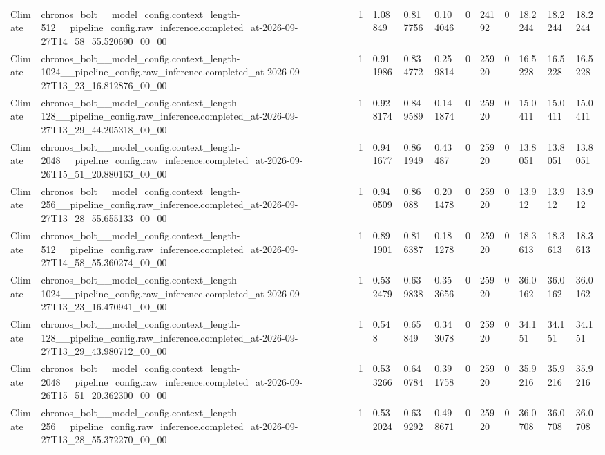 \begin{tabular}{llllllllllll}
Climate & chronos\_bolt\_\_model\_config.context\_length-512\_\_pipeline\_config.raw\_inference.completed\_at-2026-09-27T14\_58\_55.520690\_00\_00 & 1 & 1.08849 & 0.817756 & 0.104046 & 0 & 24192 & 0 & 18.2244 & 18.2244 & 18.2244 \\
Climate & chronos\_bolt\_\_model\_config.context\_length-1024\_\_pipeline\_config.raw\_inference.completed\_at-2026-09-27T13\_23\_16.812876\_00\_00 & 1 & 0.911986 & 0.834772 & 0.259814 & 0 & 25920 & 0 & 16.5228 & 16.5228 & 16.5228 \\
Climate & chronos\_bolt\_\_model\_config.context\_length-128\_\_pipeline\_config.raw\_inference.completed\_at-2026-09-27T13\_29\_44.205318\_00\_00 & 1 & 0.928174 & 0.849589 & 0.141874 & 0 & 25920 & 0 & 15.0411 & 15.0411 & 15.0411 \\
Climate & chronos\_bolt\_\_model\_config.context\_length-2048\_\_pipeline\_config.raw\_inference.completed\_at-2026-09-26T15\_51\_20.880163\_00\_00 & 1 & 0.941677 & 0.861949 & 0.43487 & 0 & 25920 & 0 & 13.8051 & 13.8051 & 13.8051 \\
Climate & chronos\_bolt\_\_model\_config.context\_length-256\_\_pipeline\_config.raw\_inference.completed\_at-2026-09-27T13\_28\_55.655133\_00\_00 & 1 & 0.940509 & 0.86088 & 0.201478 & 0 & 25920 & 0 & 13.912 & 13.912 & 13.912 \\
Climate & chronos\_bolt\_\_model\_config.context\_length-512\_\_pipeline\_config.raw\_inference.completed\_at-2026-09-27T14\_58\_55.360274\_00\_00 & 1 & 0.891901 & 0.816387 & 0.181278 & 0 & 25920 & 0 & 18.3613 & 18.3613 & 18.3613 \\
Climate & chronos\_bolt\_\_model\_config.context\_length-1024\_\_pipeline\_config.raw\_inference.completed\_at-2026-09-27T13\_23\_16.470941\_00\_00 & 1 & 0.532479 & 0.639838 & 0.353656 & 0 & 25920 & 0 & 36.0162 & 36.0162 & 36.0162 \\
Climate & chronos\_bolt\_\_model\_config.context\_length-128\_\_pipeline\_config.raw\_inference.completed\_at-2026-09-27T13\_29\_43.980712\_00\_00 & 1 & 0.548 & 0.65849 & 0.343078 & 0 & 25920 & 0 & 34.151 & 34.151 & 34.151 \\
Climate & chronos\_bolt\_\_model\_config.context\_length-2048\_\_pipeline\_config.raw\_inference.completed\_at-2026-09-26T15\_51\_20.362300\_00\_00 & 1 & 0.533266 & 0.640784 & 0.391758 & 0 & 25920 & 0 & 35.9216 & 35.9216 & 35.9216 \\
Climate & chronos\_bolt\_\_model\_config.context\_length-256\_\_pipeline\_config.raw\_inference.completed\_at-2026-09-27T13\_28\_55.372270\_00\_00 & 1 & 0.532024 & 0.639292 & 0.498671 & 0 & 25920 & 0 & 36.0708 & 36.0708 & 36.0708 \\

\end{tabular}
